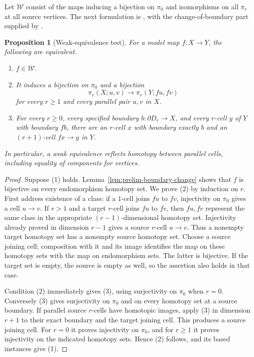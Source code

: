 \documentclass[11pt,letterpaper]{article}
\numberwithin{equation}{section}
\theoremstyle{plain}
\newtheorem{proposition}[theorem]{Proposition}
\theoremstyle{definition}
\theoremstyle{remark}
\begin{document}
Let $\mathcal W$ consist of the maps inducing a bijection on
$\pi_0$ and isomorphisms on all $\pi_r$ at all source vertices.
The next formulation is \cite[Theorem~4.18]{Ara2013}, with the
change-of-boundary part supplied by
\cite[Theorem~4.13 and Corollaries~4.14--4.15]{Ara2013}.

\begin{proposition}[Weak-equivalence test]\label{prop:weak-test}
For a model map $f:X\to Y$, the following are equivalent.
\begin{enumerate}
\item $f\in\mathcal W$.
\item It induces a bijection on $\pi_0$ and a bijection
\[
 \pi_r(X;u,v)\longrightarrow\pi_r(Y;fu,fv)
\]
for every $r\ge1$ and every parallel pair $u,v$ in $X$.
\item For every $r\ge0$, every specified boundary
$b:\partial D_r\to X$, and every $r$-cell $y$ of $Y$ with
boundary $fb$, there are an $r$-cell $x$ with boundary
\emph{exactly} $b$ and an $(r+1)$-cell $fx\to y$ in $Y$.
\end{enumerate}
In particular, a weak equivalence reflects homotopy between
parallel cells, including equality of components for vertices.
\end{proposition}

\begin{proof}
Suppose (1) holds.  Lemma~\ref{lem:prelim-boundary-change} shows
that $f$ is bijective on every endomorphism homotopy set.
We prove (2) by induction on $r$.  First address existence of
a class: if a $1$-cell joins $fu$ to $fv$, injectivity on
$\pi_0$ gives a cell $u\to v$.  If $r>1$ and a target
$r$-cell joins $fu$ to $fv$, then $fu,fv$ represent the same
class in the appropriate $(r-1)$-dimensional homotopy set.
Injectivity already proved in dimension $r-1$ gives a source
$r$-cell $u\to v$.  Thus a nonempty target homotopy set has
a nonempty source homotopy set.  Choose a source joining cell;
composition with it and its image identifies the map on these
homotopy sets with the map on endomorphism sets.  The latter
is bijective.  If the target set is empty, the source is empty
as well, so the assertion also holds in that case.

Condition (2) immediately gives (3), using surjectivity on
$\pi_0$ when $r=0$.  Conversely (3) gives surjectivity on
$\pi_0$ and on every homotopy set at a source boundary.
If parallel source $r$-cells have homotopic images, apply
(3) in dimension $r+1$ to their exact boundary and the target
joining cell.  This produces a source joining cell.  For
$r=0$ it proves injectivity on $\pi_0$, and for $r\ge1$
it proves injectivity on the indicated homotopy sets.  Hence
(2) follows, and its based instances give (1).
\end{proof}
\end{document}
